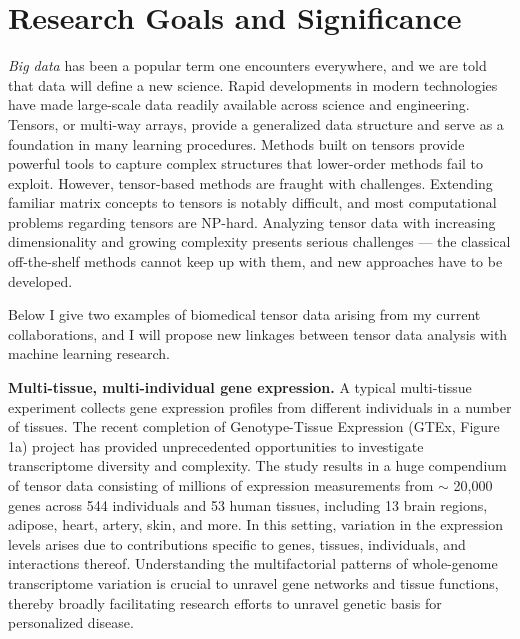 \documentclass[10pt]{article}
\theoremstyle{definition}
\theoremstyle{definition}
\theoremstyle{definition}
\begin{document}
\section{Research Goals and Significance}

\emph{Big data} has been a popular term one encounters everywhere, and we are told that data will define a new science. Rapid developments in modern technologies have made large-scale data readily available across science and engineering. Tensors, or multi-way arrays, provide a generalized data structure and serve as a foundation in many learning procedures. Methods built on tensors provide powerful tools to capture complex structures that lower-order methods fail to exploit. However, tensor-based methods are fraught with challenges. Extending familiar matrix concepts to tensors is notably difficult, and most computational problems regarding tensors are NP-hard. Analyzing tensor data with increasing dimensionality and growing complexity presents serious challenges --- the classical off-the-shelf methods cannot keep up with them, and new approaches have to be developed. 

Below I give two examples of biomedical tensor data arising from my current collaborations, and I will propose new linkages between tensor data analysis with machine learning research. 

{\bf Multi-tissue, multi-individual gene expression.} A typical multi-tissue experiment collects gene expression profiles from different individuals in a number of tissues. The recent completion of Genotype-Tissue Expression (GTEx, Figure 1a) project has provided unprecedented opportunities to investigate transcriptome diversity and complexity. The study results in a huge compendium of tensor data consisting of millions of expression measurements from $\sim$ 20,000 genes across 544 individuals and 53 human tissues, including 13 brain regions, adipose, heart, artery, skin, and more. In this setting, variation in the expression levels arises due to contributions specific to genes, tissues, individuals, and interactions thereof. Understanding the multifactorial patterns of whole-genome transcriptome variation is crucial to unravel gene networks and tissue functions, thereby broadly facilitating research efforts to unravel genetic basis for personalized disease.
\end{document}
